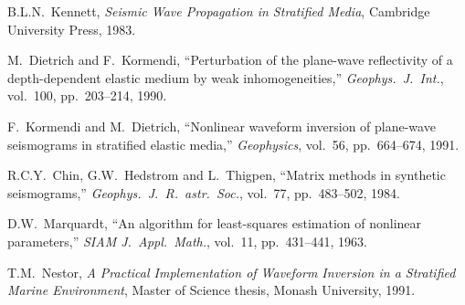 \documentclass[11pt,a4paper]{article}
\theoremstyle{plain}
\theoremstyle{remark}
\begin{document}
\begin{enumerate}[label={[\arabic*]},nosep]
  \item B.L.N.\ Kennett, \emph{Seismic Wave Propagation in Stratified Media},
    Cambridge University Press, 1983.
  \item M.\ Dietrich and F.\ Kormendi, ``Perturbation of the plane-wave
    reflectivity of a depth-dependent elastic medium by weak inhomogeneities,''
    \emph{Geophys.\ J.\ Int.}, vol.\ 100, pp.\ 203--214, 1990.
  \item F.\ Kormendi and M.\ Dietrich, ``Nonlinear waveform inversion of
    plane-wave seismograms in stratified elastic media,''
    \emph{Geophysics}, vol.\ 56, pp.\ 664--674, 1991.
  \item R.C.Y.\ Chin, G.W.\ Hedstrom and L.\ Thigpen, ``Matrix methods in
    synthetic seismograms,'' \emph{Geophys.\ J.\ R.\ astr.\ Soc.}, vol.\ 77,
    pp.\ 483--502, 1984.
  \item D.W.\ Marquardt, ``An algorithm for least-squares estimation of
    nonlinear parameters,'' \emph{SIAM J.\ Appl.\ Math.}, vol.\ 11,
    pp.\ 431--441, 1963.
  \item T.M.\ Nestor, \emph{A Practical Implementation of Waveform Inversion
    in a Stratified Marine Environment}, Master of Science thesis, Monash
    University, 1991.
\end{enumerate}
\end{document}
